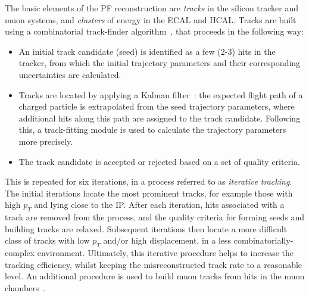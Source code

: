The basic elements of the PF reconstruction are \textit{tracks} in the silicon tracker and muon systems, and \textit{clusters} of energy in the ECAL and HCAL. Tracks are built using a combinatorial track-finder algorithm~\cite{Chatrchyan:2014fea}, that proceeds in the following way:
\begin{itemize}
    \item An initial track candidate (seed) is identified as a few (2-3) hits in the tracker, from which the initial trajectory parameters and their corresponding uncertainties are calculated.
    \item Tracks are located by applying a Kalman filter~\cite{BILLOIR1990219}: the expected flight path of a charged particle is extrapolated from the seed trajectory parameters, where additional hits along this path are assigned to the track candidate. Following this, a track-fitting module is used to calculate the trajectory parameters more precisely.
    \item The track candidate is accepted or rejected based on a set of quality criteria.
\end{itemize}
\noindent
This is repeated for six iterations, in a process referred to as \textit{iterative tracking}. The initial iterations locate the most prominent tracks, for example those with high $p_T$ and lying close to the IP. After each iteration, hits associated with a track are removed from the process, and the quality criteria for forming seeds and building tracks are relaxed. Subsequent iterations then locate a more difficult class of tracks with low $p_T$ and/or high displacement, in a less combinatorially-complex environment. Ultimately, this iterative procedure helps to increase the tracking efficiency, whilst keeping the misreconstructed track rate to a reasonable level. An additional procedure is used to build muon tracks from hits in the muon chambers~\cite{Chatrchyan:2012xi}.

